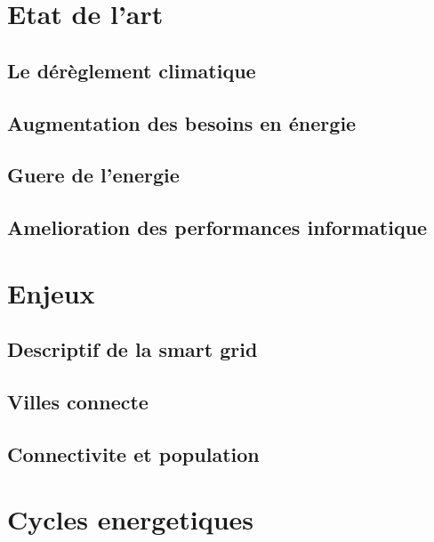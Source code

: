\chapter{Etat de l’art}
\section{Le dérèglement climatique}
\lipsum
\section{Augmentation des besoins en énergie}
\lipsum
\section{Guere de l'energie}
\lipsum
\section{Amelioration des performances informatique}
\lipsum

\chapter{Enjeux}
\section{Descriptif de la smart grid}
\lipsum




\section{Villes connecte}
\lipsum

\section{Connectivite et population}
\lipsum

\chapter{Cycles energetiques}
